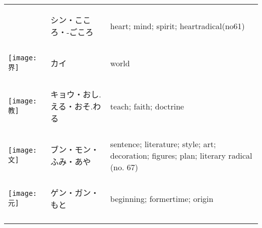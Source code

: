 \documentclass[a4paper,12pt]{extarticle}
\begin{document}
\begin{longtable}{|lp{6cm}p{4cm}|}
&
\begin{CJK}{UTF8}{min}シン・こころ・-ごころ\end{CJK}
&
heart; mind; spirit; heartradical(no61)
\\ 
\begin{minipage}{0.3\textwidth}
\centerline{
	\texttt{[image: 界]}
}
\end{minipage}
&
\begin{CJK}{UTF8}{min}カイ\end{CJK}
&
world
\\ 
\begin{minipage}{0.3\textwidth}
\centerline{
	\texttt{[image: 教]}
}
\end{minipage}
&
\begin{CJK}{UTF8}{min}キョウ・おし.える・おそ.わる\end{CJK}
&
teach; faith; doctrine
\\ 
\begin{minipage}{0.3\textwidth}
\centerline{
	\texttt{[image: 文]}
}
\end{minipage}
&
\begin{CJK}{UTF8}{min}ブン・モン・ふみ・あや\end{CJK}
&
sentence; literature; style; art; decoration; figures; plan; literary radical (no. 67)
\\ 
\begin{minipage}{0.3\textwidth}
\centerline{
	\texttt{[image: 元]}
}
\end{minipage}
&
\begin{CJK}{UTF8}{min}ゲン・ガン・もと\end{CJK}
&
beginning; formertime; origin
\\ 
\begin{minipage}{0.3\textwidth}
\centerline{
}
\end{minipage}
\end{longtable}
\end{document}
